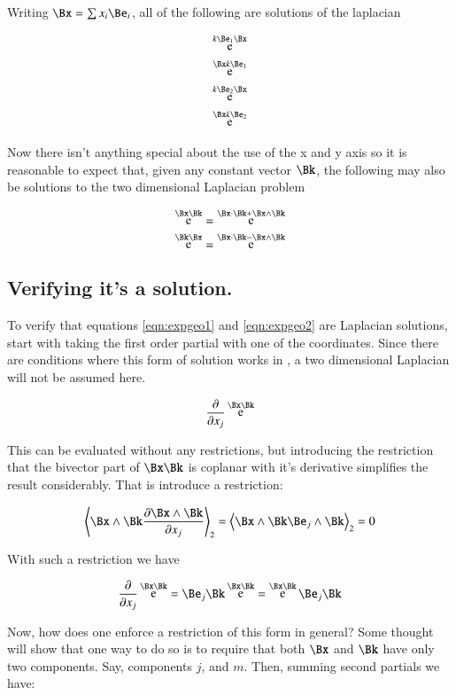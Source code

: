 \documentclass{article}      %
\newcommand{\dxj}[2] {\frac {\partial {#1}} {\partial {x_{#2}}}}
\DeclareMathOperator{\Exp}{e}
\newcommand{\gpgrade}[2] {{\left\langle{{#1}}\right\rangle}_{#2}}
\newcommand{\gpgradetwo}[1] {\gpgrade{#1}{2}}
\begin{document}
Writing $\Bx = \sum x_i \Be_i$, all of the following are solutions
of the laplacian

\begin{align*}
\Exp^{k\Be_1\Bx} \\
\Exp^{\Bx k\Be_1} \\
\Exp^{k\Be_2\Bx} \\
\Exp^{\Bx k\Be_2} \\
\end{align*}

Now there isn't anything special about the use of the x and y axis so it is reasonable to expect that, given any constant vector $\Bk$,
the following may also be solutions to the two dimensional Laplacian problem

\begin{equation}\label{eqn:expgeo1}
\Exp^{\Bx\Bk} = \Exp^{\Bx \cdot \Bk + \Bx \wedge \Bk}
\end{equation}
\begin{equation}\label{eqn:expgeo2}
\Exp^{\Bk\Bx} = \Exp^{\Bx \cdot \Bk - \Bx \wedge \Bk}
\end{equation}

\subsection{ Verifying it's a solution. }

To verify that equations \ref{eqn:expgeo1} and \ref{eqn:expgeo2} are Laplacian solutions, start with taking the first order partial with one of the coordinates.
Since there are conditions where this form of solution works in ,
a two dimensional Laplacian will not be assumed here.

\[
\dxj{}{j}\Exp^{\Bx\Bk}
\]

This can be evaluated without any restrictions, but introducing the restriction that the bivector part of $\Bx\Bk$
is coplanar with it's derivative simplifies the result considerably.  That is introduce a restriction:

\[
\gpgradetwo{ \Bx \wedge \Bk \dxj{\Bx \wedge \Bk}{j} } = \gpgradetwo{ \Bx \wedge \Bk \Be_j \wedge \Bk } = 0
\]

With such a restriction we have

\[
\dxj{}{j}\Exp^{\Bx\Bk} = \Be_j\Bk \Exp^{\Bx\Bk} = \Exp^{\Bx\Bk} \Be_j\Bk 
\]

Now, how does one enforce a restriction of this form in general?  Some thought will show that one way to do so 
is to require that
both $\Bx$ and $\Bk$ have only two components.  Say, components $j$, and $m$.  Then, summing second partials
we have:
\end{document}
